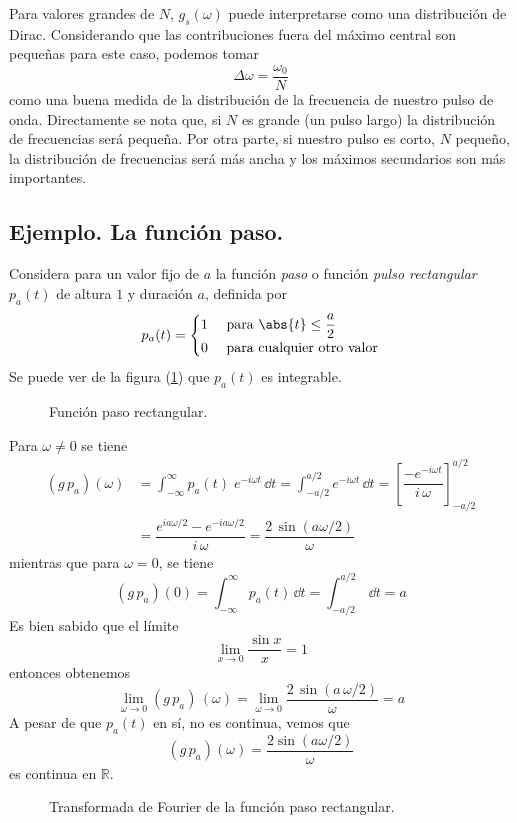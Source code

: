 Para valores grandes de $N$, $g_{s}(\omega)$ puede interpretarse como una distribución de Dirac. Considerando que las contribuciones fuera del máximo central son pequeñas para este caso, podemos tomar
\begin{equation}
\Delta \omega = \dfrac{\omega_{0}}{N}
\label{eq:ecuacion_15_32}
\end{equation}
como una buena medida de la distribución de la frecuencia de nuestro pulso de onda. Directamente se nota que, si $N$ es grande (un pulso largo) la distribución de frecuencias será pequeña. Por otra parte, si nuestro pulso es corto, $N$ pequeño, la distribución de frecuencias será más ancha y los máximos secundarios son más importantes.
\subsection*{Ejemplo. La función paso.}
Considera para un valor fijo de $a$ la función \emph{paso} o función \emph{pulso rectangular} $p_{a}(t)$ de altura $1$ y duración $a$, definida por
\begin{equation}
p_{a}(t) = \begin{cases}
1 & \text{ para } \abs{t} \leq \dfrac{a}{2} \\
0 & \text{ para cualquier otro valor} \end{cases}
\label{eq:ecuacion_06_10_Beerends}
\end{equation}
Se puede ver de la figura (\ref{fig:figura_funcionpaso}) que $p_{a}(t)$ es integrable.
\begin{figure}[H]
\centering

\caption{Función paso rectangular.}
\label{fig:figura_funcionpaso}
\end{figure}
Para $\omega \neq 0$ se tiene
\begin{align*}
(g \, p_{a}) (\omega) &= \int_{-\infty}^{\infty} p_{a}(t) \; e^{-i \omega t} \, \dd t = \int_{-a/2}^{a/2} e^{-i \omega t} \, \dd t = \left[ \dfrac{- e^{- i \omega t}}{i \, \omega} \right]_{-a/2}^{a/2} \\[0.5em]
&= \dfrac{e^{ia\omega/2} - e^{-i a \omega/2}}{i \, \omega} = \dfrac{2 \, \sin (a \omega/2)}{\omega}
\end{align*}
mientras que para $\omega = 0$, se tiene
\begin{equation*}
(g \, p_{a})(0) = \int_{-\infty}^{\infty} p_{a}(t) \, \dd t = \int_{-a/2}^{a/2} \, \dd t = a
\end{equation*}
Es bien sabido que el límite 
\[ \lim_{x \to 0} \dfrac{\sin x}{x} = 1 \]
entonces obtenemos 
\[ \lim_{\omega \to 0}  (g \, p_{a}) \, (\omega) = \lim_{\omega \to 0} \dfrac{2 \, \sin (a \, \omega /2)}{\omega} = a \]
A pesar de que $p_{a}(t)$ en sí, no es continua, vemos que
\begin{equation}
(g \, p_{a})(\omega) = \dfrac{2 \sin (a \omega/2)}{\omega}
\label{eq:ecuacion_06_11_Beerends}
\end{equation}
es continua en $\mathbb{R}$.
\begin{figure}[H]
\centering

\caption{Transformada de Fourier de la función paso rectangular.}
\label{fig:figura_Tfuncionpaso}
\end{figure}
